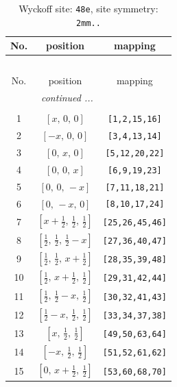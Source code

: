 \documentclass[fleqn,8pt]{jsarticle}
\begin{document}
\begin{longtable}{ccc}
\caption{Wyckoff site: {\tt 48e}, site symmetry: {\tt 2mm..}}
 \\
 \hline \hline
No. & position & mapping \\ \hline \endfirsthead

\multicolumn{2}{l}{\tablename\ \thetable{}} \\
 \hline \hline
No. & position & mapping \\ \hline \endhead

 \hline \hline
\multicolumn{2}{r}{\footnotesize\it continued ...} \\ \endfoot

 \hline \hline
\multicolumn{2}{r}{} \\ \endlastfoot

1 & $\left[ x,\, 0,\, 0 \right]$ & {\tt [1,2,15,16]} \\ \hline
2 & $\left[ - x,\, 0,\, 0 \right]$ & {\tt [3,4,13,14]} \\ \hline
3 & $\left[ 0,\, x,\, 0 \right]$ & {\tt [5,12,20,22]} \\ \hline
4 & $\left[ 0,\, 0,\, x \right]$ & {\tt [6,9,19,23]} \\ \hline
5 & $\left[ 0,\, 0,\, - x \right]$ & {\tt [7,11,18,21]} \\ \hline
6 & $\left[ 0,\, - x,\, 0 \right]$ & {\tt [8,10,17,24]} \\ \hline
7 & $\left[ x + \frac{1}{2},\, \frac{1}{2},\, \frac{1}{2} \right]$ & {\tt [25,26,45,46]} \\ \hline
8 & $\left[ \frac{1}{2},\, \frac{1}{2},\, \frac{1}{2} - x \right]$ & {\tt [27,36,40,47]} \\ \hline
9 & $\left[ \frac{1}{2},\, \frac{1}{2},\, x + \frac{1}{2} \right]$ & {\tt [28,35,39,48]} \\ \hline
10 & $\left[ \frac{1}{2},\, x + \frac{1}{2},\, \frac{1}{2} \right]$ & {\tt [29,31,42,44]} \\ \hline
11 & $\left[ \frac{1}{2},\, \frac{1}{2} - x,\, \frac{1}{2} \right]$ & {\tt [30,32,41,43]} \\ \hline
12 & $\left[ \frac{1}{2} - x,\, \frac{1}{2},\, \frac{1}{2} \right]$ & {\tt [33,34,37,38]} \\ \hline
13 & $\left[ x,\, \frac{1}{2},\, \frac{1}{2} \right]$ & {\tt [49,50,63,64]} \\ \hline
14 & $\left[ - x,\, \frac{1}{2},\, \frac{1}{2} \right]$ & {\tt [51,52,61,62]} \\ \hline
15 & $\left[ 0,\, x + \frac{1}{2},\, \frac{1}{2} \right]$ & {\tt [53,60,68,70]} \\ \hline

\end{longtable}
\end{document}
